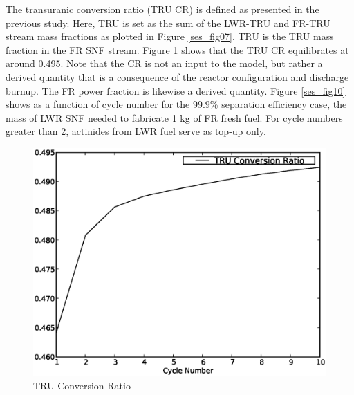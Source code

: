The transuranic conversion ratio (TRU CR) is defined as presented in the previous study.  
Here, TRU is set as the sum of the LWR-TRU and FR-TRU stream mass
fractions as plotted in Figure \ref{ses_fig07}.  TRU is the TRU 
mass fraction in the FR SNF stream.  Figure \ref{ses_fig09} shows that the TRU 
CR equilibrates at around 0.495.  Note that the CR is not an input to the model, but rather a
derived quantity that is a consequence of the reactor configuration and
discharge burnup.  The FR power fraction is likewise a derived quantity.
Figure \ref{ses_fig10} shows as a function of cycle number for the 99.9\% separation
efficiency case, the mass of LWR SNF needed to fabricate 1 kg of FR
fresh fuel.  For cycle numbers greater than 2, actinides from LWR fuel
serve as top-up only.  

\begin{figure}[htbp]
\caption{TRU Conversion Ratio}
\label{ses_fig09}
\begin{center}
\includegraphics[scale=0.5]{se_sensitivity/figs/TruCR.eps}
\end{center}
\end{figure}

